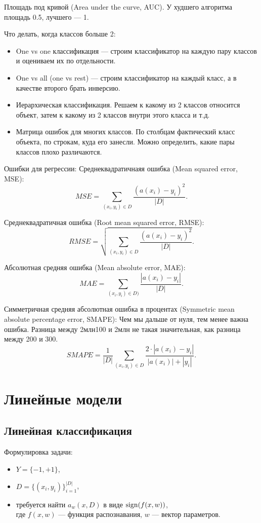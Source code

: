 
Площадь под кривой (Area under the curve, AUC). У худшего алгоритма площадь 0.5, лучшего --- 1. 

Что делать, когда классов больше 2:
\begin{itemize}
    \item One vs one классификация --- строим классификатор на каждую пару классов и оцениваем их по отдельности.
    \item One vs all (one vs rest) --- строим классификатор на каждый класс, а в качестве второго брать инверсию.
    \item Иерархическая классификация. Решаем к какому из 2 классов относится объект,
        затем к какому из 2 классов внутри этого класса и т.д.
    \item Матрица ошибок для многих классов. По столбцам фактический класс объекта, по строкам, куда его занесли. Можно определить, какие пары классов плохо различаются.
\end{itemize}

Ошибки для регрессии:
Среднеквадратичнаяя ошибка (Mean squared error, MSE):
\[
    MSE = \sum_{(x_i, y_i) \in D} \frac{(a(x_i)- y_i)^2}{|D|}.
\]

Среднеквадратичная ошибка (Root mean squared error, RMSE):
\[
    RMSE = \sqrt{\sum_{(x_i, y_i) \in D} \frac{(a(x_i) - y_i)^2}{|D|}}.
\]

Абсолютная средняя ошибка (Mean absolute error, MAE):
\[
    MAE = \sum_{(x_i, y_i) \in D)} \frac{|a(x_i) - y_i|}{|D|}.
\]

Симметричная средняя абсолютная ошибка в процентах (Symmetric mean absolute percentage error, SMAPE):
Чем мы дальше от нуля, тем менее важна ошибка. Разница между 2млн100 и 2млн не такая
значительная, как разница между 200 и 300.
\[
    SMAPE = \frac{1}{|D|} \sum_{(x_i, y_i) \in D} 
    \frac{2\cdot |a(x_i)- y_i|}{|a(x_i)| +|y_i|}.
\]

\section{Линейные модели}

\subsection{Линейная классификация}

Формулировка задачи:

\begin{itemize}
    \item $Y = \{-1, +1\}$,

    \item $D = \{(x_i, y_i)\}^{|D|}_{i=1}$,

    \item требуется найти $a_w(x, D)$ в виде $\operatorname{sign}(f(x, w))$,\\
        где $f(x, w)$ --- функция распознавания,
        $w$ --- вектор параметров.
\end{itemize}


